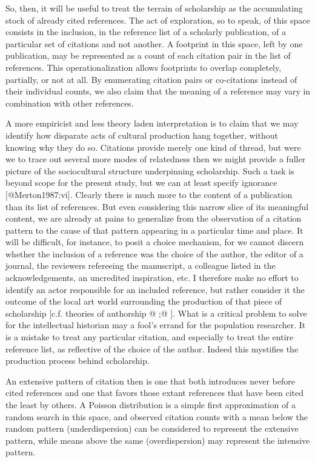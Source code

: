 \documentclass [PhD] {uclathes}
\begin{document}
So, then, it will be useful to treat the terrain of scholarship as the
accumulating stock of already cited references. The act of exploration,
so to speak, of this space consists in the inclusion, in the reference
list of a scholarly publication, of a particular set of citations and
not another. A footprint in this space, left by one publication, may be
represented as a count of each citation pair in the list of references.
This operationalization allows footprints to overlap completely,
partially, or not at all. By enumerating citation pairs or co-citations
instead of their individual counts, we also claim that the meaning of a
reference may vary in combination with other references.

A more empiricist and less theory laden interpretation is to claim that
we may identify how disparate acts of cultural production hang together,
without knowing why they do so. Citations provide merely one kind of
thread, but were we to trace out several more modes of relatedness then
we might provide a fuller picture of the sociocultural structure
underpinning scholarship. Such a task is beyond scope for the present
study, but we can at least specify ignorance {[}@Merton1987:vi{]}.
Clearly there is much more to the content of a publication than its list
of references. But even considering this narrow slice of its meaningful
content, we are already at pains to generalize from the observation of a
citation pattern to the cause of that pattern appearing in a particular
time and place. It will be difficult, for instance, to posit a choice
mechanism, for we cannot discern whether the inclusion of a reference
was the choice of the author, the editor of a journal, the reviewers
refereeing the manuscript, a colleague listed in the acknowledgements,
an uncredited inspiration, etc. I therefore make no effort to identify
an actor responsible for an included reference, but rather consider it
the outcome of the local art world surrounding the production of that
piece of scholarship {[}c.f. theories of authorship @ ;@ {]}. What is a
critical problem to solve for the intellectual historian may a fool's
errand for the population researcher. It is a mistake to treat any
particular citation, and especially to treat the entire reference list,
as reflective of the choice of the author. Indeed this mystifies the
production process behind scholarship.

An extensive pattern of citation then is one that both introduces never
before cited references and one that favors those extant references that
have been cited the least by others. A Poisson distribution is a simple
first approximation of a random search in this space, and observed
citation counts with a mean below the random pattern (underdispersion)
can be considered to represent the extensive pattern, while means above
the same (overdispersion) may represent the intensive pattern.
\end{document}
